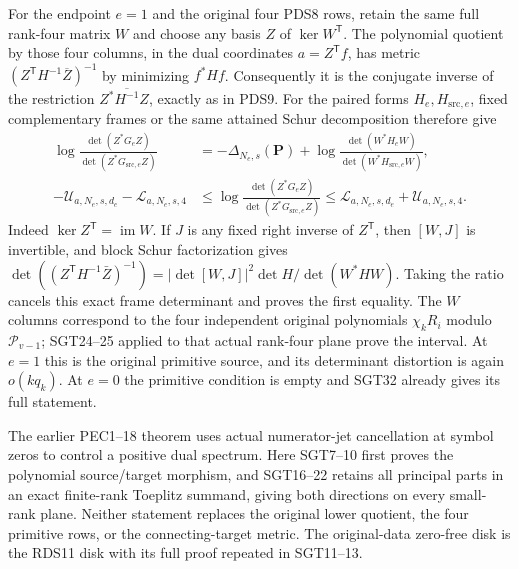 \documentclass[10pt]{article}
\begin{document}
For the endpoint $e=1$ and the original four PDS8 rows, retain the same full rank-four
matrix $W$ and choose any basis $Z$ of $\ker W^{\mathsf T}$.
The polynomial quotient by those four columns, in the dual coordinates
$a=Z^{\mathsf T}f$, has metric
$(Z^{\mathsf T}H^{-1}\overline Z)^{-1}$ by minimizing $f^*Hf$.
Consequently it is the conjugate inverse of the restriction
$Z^*\overline{H^{-1}}Z$, exactly as in PDS9. For the paired
forms $H_e,H_{\mathrm{src},e}$, fixed complementary frames or the
same attained Schur decomposition therefore give
\[
\begin{split}
 \log\frac{\det(Z^*G_eZ)}
              {\det(Z^*G_{\mathrm{src},e}Z)}
 &=-\Delta_{N_e,s}(\mathbf P)
   +\log\frac{\det(W^*H_eW)}
                   {\det(W^*H_{\mathrm{src},e}W)},\\
 -\mathcal U_{a,N_e,s,d_e}-\mathcal L_{a,N_e,s,4}
 &\le \log\frac{\det(Z^*G_eZ)}
                   {\det(Z^*G_{\mathrm{src},e}Z)}
 \le\mathcal L_{a,N_e,s,d_e}+\mathcal U_{a,N_e,s,4}.
\end{split}\tag{SGT33}
\]
Indeed $\ker Z^{\mathsf T}=\operatorname{im}W$. If $J$ is any
fixed right inverse of $Z^{\mathsf T}$, then $[W,J]$ is invertible,
and block Schur factorization gives
$\det((Z^{\mathsf T}H^{-1}\bar Z)^{-1})
 =|\det[W,J]|^2\det H/\det(W^*HW)$.
Taking the ratio cancels this exact frame determinant and proves
the first equality. The $W$ columns correspond to the four independent
original polynomials $\chi_kR_i$ modulo $\mathcal P_{v-1}$;
SGT24--25 applied to that actual rank-four plane prove the interval.
At $e=1$ this is the original primitive source, and its determinant
distortion is again $o(kq_k)$. At $e=0$ the primitive condition is
empty and SGT32 already gives its full statement.

The earlier PEC1--18 theorem uses actual numerator-jet cancellation
at symbol zeros to control a positive dual spectrum. Here SGT7--10
first proves the polynomial source/target morphism, and SGT16--22
retains all principal parts in an exact finite-rank Toeplitz summand,
giving both directions on every small-rank plane. Neither statement
replaces the original lower quotient, the four primitive rows, or the
connecting-target metric. The original-data zero-free disk is the
RDS11 disk with its full proof repeated in SGT11--13.


\end{document}

